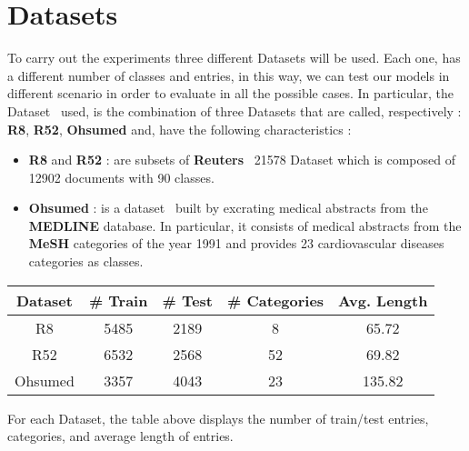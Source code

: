 \section{Datasets}
To carry out the experiments three different Datasets will be used. Each one, has a different number of classes and entries, in this way, we can test our models in different scenario in order to evaluate in all the possible cases. In particular, the Dataset~\cite{dataset-r8r52ohsumed} used, is the combination of three Datasets that are called, respectively : \textbf{R8}, \textbf{R52}, \textbf{Ohsumed} and, have the following characteristics :
\begin{itemize}
    \item \textbf{R8} and \textbf{R52} : are subsets of \textbf{Reuters}~\cite{dataset-reuters} 21578 Dataset which is composed of 12902 documents with 90 classes.
    \item \textbf{Ohsumed} : is a dataset~\cite{dataset-ohsumed} built by excrating medical abstracts from the \textbf{MEDLINE} database. In particular, it consists of medical abstracts from the \textbf{MeSH} categories of the year 1991 and provides 23 cardiovascular diseases categories as classes.
\end{itemize}
\begin{center}
    \begin{tabular}{|c|c|c|c|c|}\hline
        Dataset & \# Train & \# Test & \# Categories & Avg. Length\\\hline
        R8 & 5485 & 2189 & 8 & 65.72 \\\hline
        R52 & 6532 & 2568 & 52 & 69.82 \\\hline
        Ohsumed & 3357 & 4043 & 23 & 135.82 \\\hline
    \end{tabular}
\end{center}
For each Dataset, the table above displays the number of train/test entries, categories, and average length of entries.
